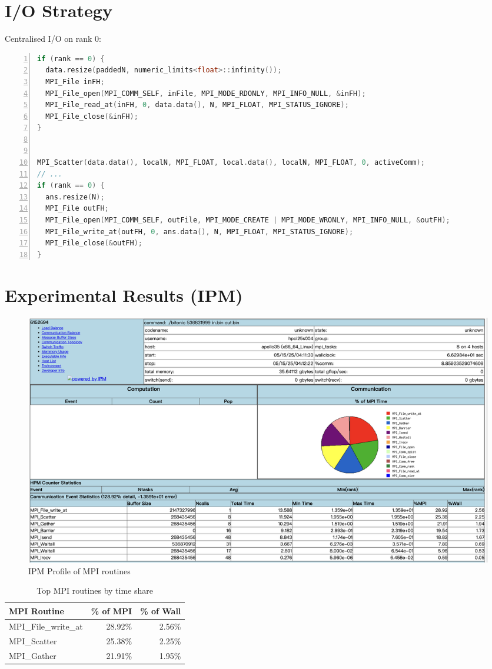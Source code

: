 \documentclass{article}
\begin{document}
\section*{I/O Strategy}
Centralised I/O on rank 0:
\begin{lstlisting}[language=C++, basicstyle=\ttfamily\small, keywordstyle=\color{blue}\bfseries, commentstyle=\color{gray}\itshape, stringstyle=\color{red}, numbers=left, numberstyle=\tiny\color{gray}, stepnumber=1, frame=single, showstringspaces=false, breaklines=true]
if (rank == 0) {
  data.resize(paddedN, numeric_limits<float>::infinity());
  MPI_File inFH;
  MPI_File_open(MPI_COMM_SELF, inFile, MPI_MODE_RDONLY, MPI_INFO_NULL, &inFH);
  MPI_File_read_at(inFH, 0, data.data(), N, MPI_FLOAT, MPI_STATUS_IGNORE);
  MPI_File_close(&inFH);
}


MPI_Scatter(data.data(), localN, MPI_FLOAT, local.data(), localN, MPI_FLOAT, 0, activeComm);
// ...
if (rank == 0) {
  ans.resize(N);
  MPI_File outFH;
  MPI_File_open(MPI_COMM_SELF, outFile, MPI_MODE_CREATE | MPI_MODE_WRONLY, MPI_INFO_NULL, &outFH);
  MPI_File_write_at(outFH, 0, ans.data(), N, MPI_FLOAT, MPI_STATUS_IGNORE);
  MPI_File_close(&outFH);
}
\end{lstlisting}

\section*{Experimental Results (IPM)}
\begin{figure}[h!]
    \centering
    \includegraphics[width=1\textwidth]{./img/IPM.png}
    \caption{IPM Profile of MPI routines}
\end{figure}

\begin{table}[h!]
    \centering
    \begin{tabular}{lrr}
        \hline
        MPI Routine & \% of MPI & \% of Wall \\
        \hline
        MPI\_File\_write\_at & 28.92\% & 2.56\% \\
        MPI\_Scatter         & 25.38\% & 2.25\% \\
        MPI\_Gather          & 21.91\% & 1.95\% \\
        \hline
    \end{tabular}
    \caption{Top MPI routines by time share}
\end{table}
\end{document}
